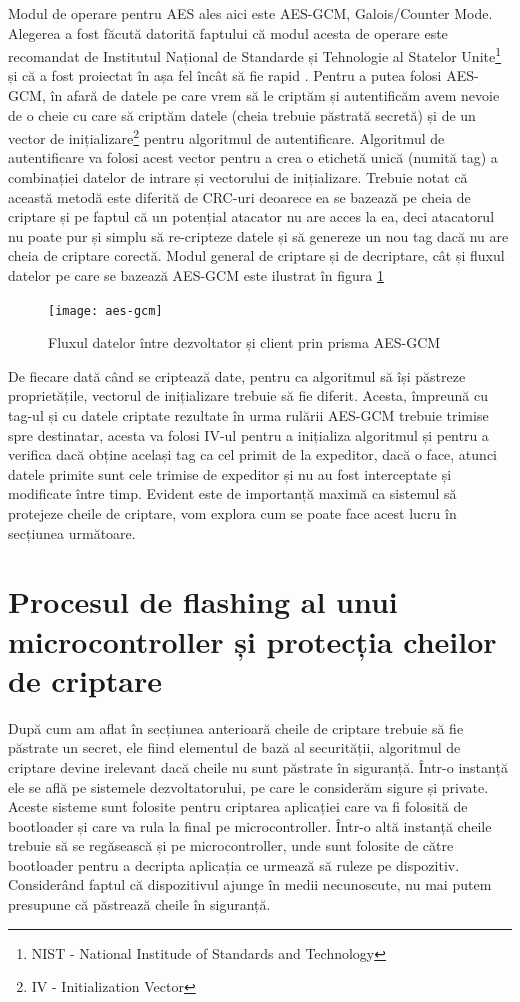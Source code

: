 \documentclass[12pt,a4paper,titlepage]{report}
\begin{document}
Modul de operare pentru AES ales aici este AES-GCM, Galois/Counter Mode. Alegerea a fost făcută datorită faptului că modul acesta de operare este recomandat de Institutul Național de Standarde și Tehnologie al Statelor Unite\footnote{NIST - National Institude of Standards and Technology} \cite{nistGCM} și că a fost proiectat în așa fel încât să fie rapid \cite{gcmSpec}. Pentru a putea folosi AES-GCM, în afară de datele pe care vrem să le criptăm și autentificăm avem nevoie de o cheie cu care să criptăm datele (cheia trebuie păstrată secretă) și de un vector de inițializare\footnote{IV - Initialization Vector} pentru algoritmul de autentificare. Algoritmul de autentificare va folosi acest vector pentru a crea o etichetă unică (numită tag) a combinației datelor de intrare și vectorului de inițializare. Trebuie notat că această metodă este diferită de CRC-uri deoarece ea se bazează pe cheia de criptare și pe faptul că un potențial atacator nu are acces la ea, deci atacatorul nu poate pur și simplu să re-cripteze datele și să genereze un nou tag dacă nu are cheia de criptare corectă. Modul general de criptare și de decriptare, cât și fluxul datelor pe care se bazează AES-GCM este ilustrat în figura \ref{howAesWorks}

\begin{figure}[h]
    \centering
    \texttt{[image: aes-gcm]}
    \caption{Fluxul datelor între dezvoltator și client prin prisma AES-GCM}
\label{howAesWorks}
\end{figure}

De fiecare dată când se criptează date, pentru ca algoritmul să își păstreze proprietățile, vectorul de inițializare trebuie să fie diferit. Acesta, împreună cu tag-ul și cu datele criptate rezultate în urma rulării AES-GCM trebuie trimise spre destinatar, acesta va folosi IV-ul pentru a inițializa algoritmul și pentru a verifica dacă obține același tag ca cel primit de la expeditor, dacă o face, atunci datele primite sunt cele trimise de expeditor și nu au fost interceptate și modificate între timp. Evident este de importanță maximă ca sistemul să protejeze cheile de criptare, vom explora cum se poate face acest lucru în secțiunea următoare.

\section{Procesul de flashing al unui microcontroller și protecția cheilor de criptare}
După cum am aflat în secțiunea anterioară cheile de criptare trebuie să fie păstrate un secret, ele fiind elementul de bază al securității, algoritmul de criptare devine irelevant dacă cheile nu sunt păstrate în siguranță.
Într-o instanță ele se află pe sistemele dezvoltatorului, pe care le considerăm sigure și private. Aceste sisteme sunt folosite pentru criptarea aplicației care va fi folosită de bootloader și care va rula la final pe microcontroller. Într-o altă instanță cheile trebuie să se regăsească și pe microcontroller, unde sunt folosite de către bootloader pentru a decripta aplicația ce urmează să ruleze pe dispozitiv. Considerând faptul că dispozitivul ajunge în medii necunoscute, nu mai putem presupune că păstrează cheile în siguranță.
\end{document}
